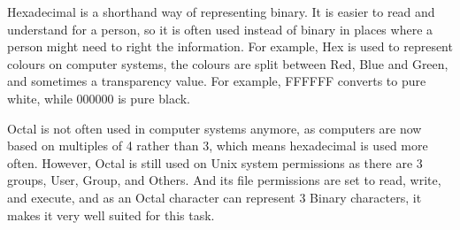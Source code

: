 \documentclass[a4paper,12pt]{article}
\begin{document}
Hexadecimal is a shorthand way of representing binary. It is easier to read and understand for a person, so it is often used instead of binary in places where a person might need to right the information. For example, Hex is used to represent colours on computer systems, the colours are split between Red, Blue and Green, and sometimes a transparency value. For example, FFFFFF converts to pure white, while 000000 is pure black.

Octal is not often used in computer systems anymore, as computers are now based on multiples of 4 rather than 3, which means hexadecimal is used more often. However, Octal is still used on Unix system permissions as there are 3 groups, User, Group, and Others. And its file permissions are set to read, write, and execute, and as an Octal character can represent 3 Binary characters, it makes it very well suited for this task.
\end{document}
